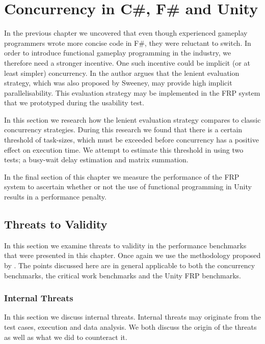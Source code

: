 \chapter{Concurrency in C\#, F\# and Unity}
In the previous chapter we uncovered that even though experienced gameplay programmers wrote more concise code in F\#, they were reluctant to switch. In order to introduce functional gameplay programming in the industry, we therefore need a stronger incentive. One such incentive could be implicit (or at least simpler) concurrency. In \cite{DBLP:journals/cl/Tremblay-parallel} the author argues that the lenient evaluation strategy, which was also proposed by Sweeney, may provide high implicit parallelisability. This evaluation strategy may be implemented in the \gls{FRP} system that we prototyped during the usability test.

In this section we research how the lenient evaluation strategy compares to classic concurrency strategies. During this research we found that there is a certain threshold of task-sizes, which must be exceeded before concurrency has a positive effect on execution time. We attempt to estimate this threshold in  using two tests; a busy-wait delay estimation and matrix summation.

In the final section of this chapter we measure the performance of the \gls{FRP} system to ascertain whether or not the use of functional programming in Unity results in a performance penalty.





\section{Threats to Validity}
In this section we examine threats to validity in the performance benchmarks that were presented in this chapter. Once again we use the methodology proposed by \cite{mcleod:validity}. The points discussed here are in general applicable to both the concurrency benchmarks, the critical work benchmarks and the Unity \gls{FRP} benchmarks.


\subsection{Internal Threats}
In this section we discuss internal threats. Internal threats may originate from the test cases, execution and data analysis. We both discuss the origin of the threats as well as what we did to counteract it.

